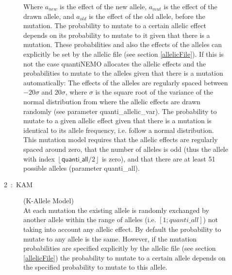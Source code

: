 \documentclass[letterpaper,12pt,oneside]{book}
\begin{document}
\begin{description}
\begin{description}
Where $a_{new}$ is the effect of the new allele, $a_{mut}$ is the effect of the drawn allele, and $a_{old}$ is the effect of the old allele, before the mutation.
The probability to mutate to a certain allelic effect depends on its probability to mutate to it given that there is a mutation. These probabilities and also the effects of the alleles can explicitly be set by the allelic file (see section \ref{allelicFile}). If this is not the case quantiNEMO allocates the allelic effects and the probabilities to mutate to the alleles given that there is a mutation automatically: The effects of the alleles are regularly spaced between $-20\sigma$ and $20\sigma$, where $\sigma$ is the square root of the variance of the normal distribution from where the allelic effects are drawn randomly (see parameter \textsf{quanti\_allelic\_var}). The probability to mutate to a given allelic effect given that there is a mutation is identical to its allele frequency, i.e. follow a normal distribution. This mutation model requires that the allelic effects are regularly spaced around zero, that the number of alleles is odd (thus the allele with index $\left\lfloor \textsf{quanti\_all}/2\right\rfloor$ is zero), and that there are at least 51 possible alleles (parameter \textsf{quanti\_all}).  

\item[2~:~KAM] (K-Allele Model)\\
At each mutation the existing allele is randomly exchanged by another allele within the range of alleles (i.e. $[1; quanti\_all]$) not taking into account any allelic effect. By default the probability to mutate to any allele is the same. However, if the mutation probabilities are specified explicitly by the allelic file (see section \ref{allelicFile}) the probability to mutate to a certain allele depends on the specified probability to mutate to this allele.


\end{description}
\end{description}
\end{document}
